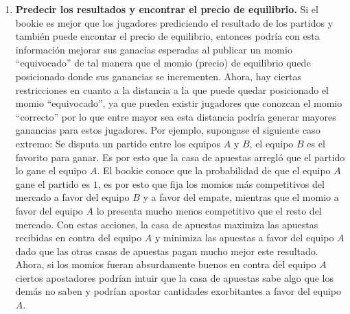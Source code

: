 \begin{enumerate}
	
	\item \textbf{Predecir los resultados y encontrar el precio de equilibrio.} Si el bookie es mejor que los jugadores prediciendo el resultado de los partidos y también puede encontar el precio de equilibrio, entonces podría con esta información mejorar sus ganacias esperadas al publicar un momio ``equivocado'' de tal manera que el momio (precio) de equilibrio quede posicionado donde sus ganancias se incrementen. Ahora, hay ciertas restricciones en cuanto a la distancia a la que puede quedar posicionado el momio ``equivocado'', ya que pueden existir jugadores que conozcan el momio ``correcto'' por lo que entre mayor sea esta distancia podría generar mayores ganancias para estos jugadores. Por ejemplo, supongase el siguiente caso extremo: Se disputa un partido entre los equipos $A$ y $B$, el equipo $B$ es el favorito para ganar. Es por esto que la casa de apuestas arregló que el partido lo gane el equipo $A$. El bookie conoce que la probabilidad de que el equipo $A$ gane el partido es $1$, es por esto que fija los momios más competitivos del mercado a favor del equipo $B$ y a favor del empate, mientras que el momio a favor del equipo $A$ lo presenta mucho menos competitivo que el resto del mercado. Con estas acciones, la casa de apuestas maximiza las apuestas recibidas en contra del equipo $A$ y minimiza las apuestas a favor del equipo $A$ dado que las otras casas de apuestas pagan mucho mejor este resultado. Ahora, si los momios fueran absurdamente buenos en contra del equipo $A$ ciertos apostadores podrían intuir que la casa de apuestas sabe algo que los demás no saben y podrían apostar cantidades exorbitantes a favor del equipo $A$.
\end{enumerate}


